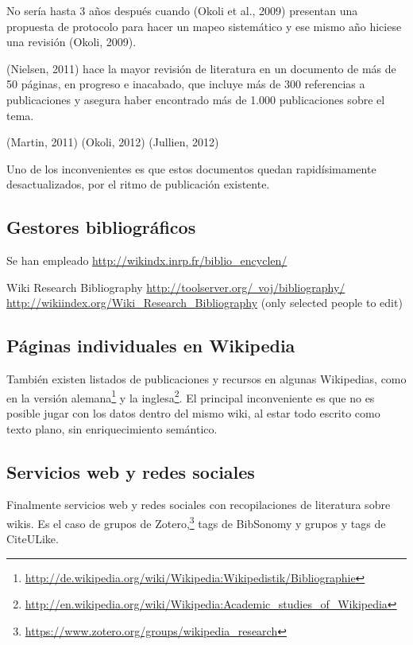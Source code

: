\documentclass[twoside]{article}
\begin{document}
\begin{multicols}{2}
No ser\'{i}a hasta 3 a\~{n}os despu\'{e}s cuando (Okoli et al., 2009) presentan una propuesta de protocolo para hacer un mapeo sistem\'{a}tico y ese mismo a\~{n}o hiciese una revisi\'{o}n (Okoli, 2009).

(Nielsen, 2011) hace la mayor revisi\'{o}n de literatura en un documento de m\'{a}s de 50 p\'{a}ginas, en progreso e inacabado, que incluye m\'{a}s de 300 referencias a publicaciones y asegura haber encontrado m\'{a}s de 1.000 publicaciones sobre el tema.

(Martin, 2011)
(Okoli, 2012)
(Jullien, 2012)

Uno de los inconvenientes es que estos documentos quedan rapid\'{i}simamente desactualizados, por el ritmo de publicaci\'{o}n existente.

\subsection{Gestores bibliogr\'{a}ficos}
Se han empleado \href{http://wikindx.inrp.fr/biblio_encyclen/}{http://wikindx.inrp.fr/biblio\_encyclen/}

Wiki Research Bibliography
\href{http://toolserver.org/~voj/bibliography/}{http://toolserver.org/~voj/bibliography/}
\href{http://wikiindex.org/Wiki_Research_Bibliography}{http://wikiindex.org/Wiki\_Research\_Bibliography}
(only selected people to edit)

\subsection{P\'{a}ginas individuales en Wikipedia}
Tambi\'{e}n existen listados de publicaciones y recursos en algunas Wikipedias, como en la versi\'{o}n alemana\footnote{\href{http://de.wikipedia.org/wiki/Wikipedia:Wikipedistik/Bibliographie}{http://de.wikipedia.org/wiki/Wikipedia:Wikipedistik/Bibliographie}} y la inglesa\footnote{\href{http://en.wikipedia.org/wiki/Wikipedia:Academic_studies_of_Wikipedia}{http://en.wikipedia.org/wiki/Wikipedia:Academic\_studies\_of\_Wikipedia}}. El principal inconveniente es que no es posible jugar con los datos dentro del mismo wiki, al estar todo escrito como texto plano, sin enriquecimiento sem\'{a}ntico.

\subsection{Servicios web y redes sociales}
Finalmente servicios web y redes sociales con recopilaciones de literatura sobre wikis. Es el caso de grupos de Zotero,\footnote{\href{https://www.zotero.org/groups/wikipedia_research}{https://www.zotero.org/groups/wikipedia\_research}} tags de BibSonomy y grupos y tags de CiteULike.


\end{multicols}
\end{document}
